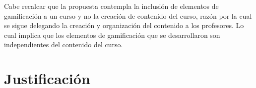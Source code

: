  \noindent Cabe recalcar que la propuesta contempla la inclusión de elementos de
 gamificación a un curso y no la creación de contenido del curso, razón por la cual
 se sigue delegando la creación y organización del contenido a los profesores. Lo
 cual implica que los elementos de gamificación que se desarrollaron son
 independientes del contenido del curso.

\section{Justificación} \label{sec:justificacion} %







